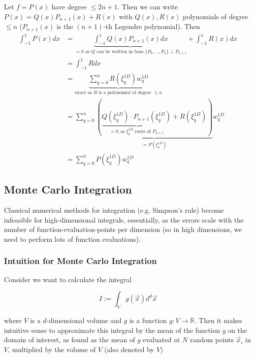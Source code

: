Let $f = P(x)$ have degree $\leq 2n+1$. Then we can write
$P(x) = Q(x) P_{n+1}(x) + R(x)$ with $Q(x), R(x)$ polynomials of degree $\leq n$ ($P_{n+1}(x)$ is the $(n+1)$-th Legendre polynomial).
Then 
\begin{equation}
    \begin{aligned}
        \int_{-1}^{1} P(x) d x &=\underbrace{\int_{-1}^{1} Q(x) P_{n+1}(x) d x}_{=0\text{ as } Q \text{ can be written in base } \{P_0,\dots,P_n\} \perp P_{n+1}}+\int_{-1}^{1} R(x) d x \\
        &=\int_{-1}^{1} R d x \\
        &=\underbrace{\sum_{q=0}^{n} R\left(\xi_{q}^{1 D}\right) w_{q}^{1 D}}_{\text{exact as } R \text{ is a polynomial of degree } \leq n} \\
        &=\sum_{q=0}^{n} \underbrace{\left(\underbrace{Q(\xi_{q}^{1 D}) \cdot P_{n+1}(\xi_{q}^{1 D})}_{=0, \text{as } \xi_{q}^{1 D} \text{ roots of } P_{n+1}} + R\left(\xi_{q}^{1 D}\right)\right)}_{=P(\xi_{q}^{1 D})} w_{q}^{1 D} \\
        &= \sum_{q=0}^{n} P(\xi_{q}^{1 D}) w_{q}^{1 D}
    \end{aligned}
\end{equation}

\subsection{Monte Carlo Integration}
\label{app:monte_carlo}

Classical numerical methods for integration (e.g. Simpson's rule) become infeasible for high-dimensional integrals,
essentially, as the errors scale with the number of function-evaluation-points per dimension (so in high dimensions, we need
to perform lots of function evaluations).

\subsubsection{Intuition for Monte Carlo Integration}
Consider we want to calculate the integral

\begin{equation}
    I := \int_{V} g(\vec{x}) d^d \vec{x}
\end{equation}

where $V$ is a $d$-dimensional volume and $g$ is a function $g: V \rightarrow \mathbb{R}$. Then it makes intuitive sense
to approximate this integral by the mean of the function $g$ on the domain of interest, as found as the mean of $g$ evaluated
at $N$ random points $\vec{x}_i$ in $V$, multiplied by the volume of $V$ (also denoted by $V$)

